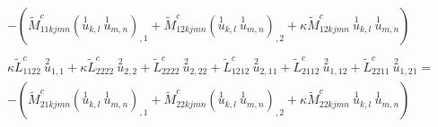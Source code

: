 \documentclass[11pt]{report}
\begin{document}
\begin{appendices}
\begin{align}
\begin{split}
-\left(\tilde{M}^c_{11kjmn}(\overset{1}{u}_{k,l} \: \overset{1}{u}_{m,n})_{,1} + \tilde{M}^c_{12kjmn}(\overset{1}{u}_{k,l} \: \overset{1}{u}_{m,n})_{,2}  + \kappa \tilde{M}^c_{12kjmn} \: \overset{1}{u}_{k,l} \: \overset{1}{u}_{m,n} \right) \label{eq:exp_pde_expand_1}
\end{split}
\\
\begin{split}
\kappa \tilde{L}^{c}_{1122} \: \overset{2}{u}_{1,1} + \kappa \tilde{L}^{c}_{2222} \: \overset{2}{u}_{2,2} + \tilde{L}^{c}_{2222} \: \overset{2}{u}_{2,22}+ \tilde{L}^{c}_{1212} \: \overset{2}{u}_{2,11}+ \tilde{L}^{c}_{2112} \: \overset{2}{u}_{1,12}  + \tilde{L}^{c}_{2211} \: \overset{2}{u}_{1,21} = \\
-\left(\tilde{M}^c_{21kjmn}(\overset{1}{u}_{k,l} \: \overset{1}{u}_{m,n})_{,1} + \tilde{M}^c_{22kjmn}(\overset{1}{u}_{k,l} \: \overset{1}{u}_{m,n})_{,2}  + \kappa \tilde{M}^c_{22kjmn} \: \overset{1}{u}_{k,l} \: \overset{1}{u}_{m,n} \right) \label{eq:exp_pde_expand_2}
\end{split}
\end{align}


\end{appendices}
\end{document}
